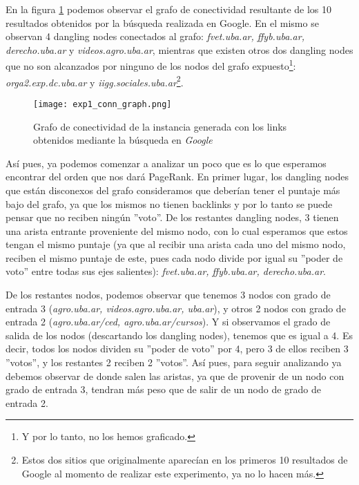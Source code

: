 \par En la figura \ref{fig:uba.ar_graph} podemos observar el grafo de
conectividad resultante de los 10 resultados obtenidos por la b\'usqueda
realizada en Google. En el mismo se observan 4 dangling nodes conectados al
grafo: \emph{fvet.uba.ar, ffyb.uba.ar, derecho.uba.ar} y
\emph{videos.agro.uba.ar}, mientras que existen otros dos dangling nodes que no
son alcanzados por ninguno de los nodos del grafo expuesto\footnote{Y por lo
tanto, no los hemos graficado.}: \emph{orga2.exp.dc.uba.ar} y
\emph{iigg.sociales.uba.ar}\footnote{Estos dos sitios que originalmente
aparec\'ian en los primeros 10 resultados de Google al momento de realizar este
experimento, ya no lo hacen m\'as.}.

\begin{figure}[H]
    \centering
    \texttt{[image: exp1\_conn\_graph.png]}
    \caption{Grafo de conectividad de la instancia generada con los links
        obtenidos mediante la b\'usqueda en \emph{Google}}
    \label{fig:uba.ar_graph}
\end{figure}

\par As\'i pues, ya podemos comenzar a analizar un poco que es lo que esperamos
encontrar del orden que nos dar\'a PageRank. En primer lugar, los dangling nodes
que est\'an disconexos del grafo consideramos que deber\'ian tener el puntaje
m\'as bajo del grafo, ya que los mismos no tienen backlinks y por lo tanto se
puede pensar que no reciben ning\'un ''voto''. De los restantes dangling nodes,
3 tienen una arista entrante proveniente del mismo nodo, con lo cual esperamos
que estos tengan el mismo puntaje (ya que al recibir una arista cada uno del
mismo nodo, reciben el mismo puntaje de este, pues cada nodo divide por igual su
''poder de voto'' entre todas sus ejes salientes): \emph{fvet.uba.ar,
ffyb.uba.ar, derecho.uba.ar}.

\par De los restantes nodos, podemos observar que tenemos 3 nodos con grado de
entrada 3 (\emph{agro.uba.ar, videos.agro.uba.ar, uba.ar}), y otros 2 nodos con
grado de entrada 2 (\emph{agro.uba.ar/ced, agro.uba.ar/cursos}). Y si observamos
el grado de salida de los nodos (descartando los dangling nodes), tenemos que es
igual a 4. Es decir, todos los nodos dividen su ''poder de voto'' por 4, pero 3
de ellos reciben 3 ''votos'', y los restantes 2 reciben 2 ''votos''. As\'i pues,
para seguir analizando ya debemos observar de donde salen las aristas, ya que de
provenir de un nodo con grado de entrada 3, tendran m\'as peso que de salir de
un nodo de grado de entrada 2.

